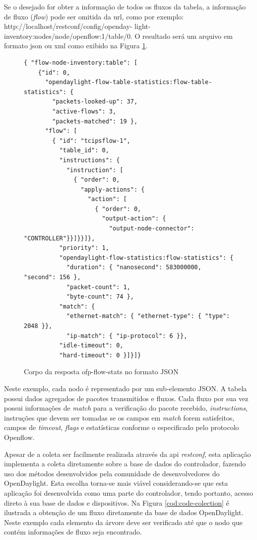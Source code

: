 Se o desejado for obter a informação de todos os fluxos da tabela, a informação de fluxo  (\textit{flow}) pode ser omitida da \gls{url}, como por exemplo: http://localhost/restconf/config/openday- light-inventory:nodes/node/openflow:1/table/0. O resultado será um arquivo em formato \gls{json} ou \gls{xml} como exibido na Figura \ref{cod:ofp-flow-stats}.
\begin{figure}[H]
  \centering
  \caption{Corpo da resposta ofp-flow-stats no formato JSON}
\begin{lstlisting}[belowskip=-0.05 \baselineskip]
{ "flow-node-inventory:table": [
    {"id": 0,
      "opendaylight-flow-table-statistics:flow-table-statistics": {
        "packets-looked-up": 37,
        "active-flows": 3,
        "packets-matched": 19 },
      "flow": [
        { "id": "tcipsflow-1",
          "table_id": 0,
          "instructions": {
            "instruction": [
              { "order": 0,
                "apply-actions": {
                  "action": [
                    { "order": 0,
                      "output-action": {
                        "output-node-connector": "CONTROLLER"}}]}}]},
          "priority": 1,
          "opendaylight-flow-statistics:flow-statistics": {
            "duration": { "nanosecond": 583000000, "second": 156 },
            "packet-count": 1, 
            "byte-count": 74 },
          "match": {
            "ethernet-match": { "ethernet-type": { "type": 2048 }},
            "ip-match": { "ip-protocol": 6 }},
          "idle-timeout": 0,
          "hard-timeout": 0 }]}]}
\end{lstlisting}
 \label{cod:ofp-flow-stats}
 \end{figure}
Neste exemplo, cada nodo é representado por um sub-elemento JSON. A tabela possui dados agregados de pacotes transmitidos e fluxos. Cada fluxo por sua vez possui informações de \textit{match} para a verificação do pacote recebido, \textit{instructions}, instruções que devem ser tomadas se os campos em \textit{match} forem satisfeitos, campos de \textit{timeout}, \textit{flags} e estatísticas conforme o especificado pelo protocolo Openflow.
 
Apesar de a coleta ser facilmente realizada através da \gls{api} \textit{restconf}, esta aplicação implementa a coleta diretamente sobre a base de dados do controlador, fazendo uso dos métodos desenvolvidos pela comunidade de desenvolvedores do OpenDaylight. Esta escolha torna-se mais viável considerando-se que esta aplicação foi desenvolvida como uma parte do controlador, tendo portanto, acesso direto à sua base de dados e dispositivos. Na Figura \ref{cod:code-colection} é ilustrada a obtenção de um fluxo diretamente da base de dados OpenDaylight. Neste exemplo cada elemento da árvore deve ser verificado até que o nodo que contém informações de fluxo seja encontrado.

